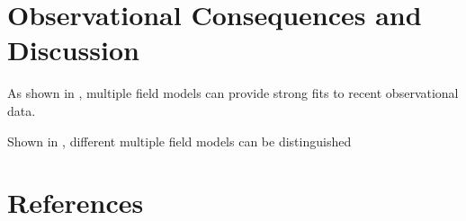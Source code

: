 \documentclass[12pt]{article}
\begin{document}
\section{Observational Consequences and Discussion}
\par As shown in \cite{duration}, multiple field models can provide strong fits to recent observational data.
\par Shown in \cite{duration}, different multiple field models can be distinguished
\cite{curvaton}
\cite{modul}
\cite{trispec}
\cite{duration}
\cite{waterfall}
\section*{References}
\printbibliography[heading=none]
\begin{equation}
\end{equation}
\end{document}
